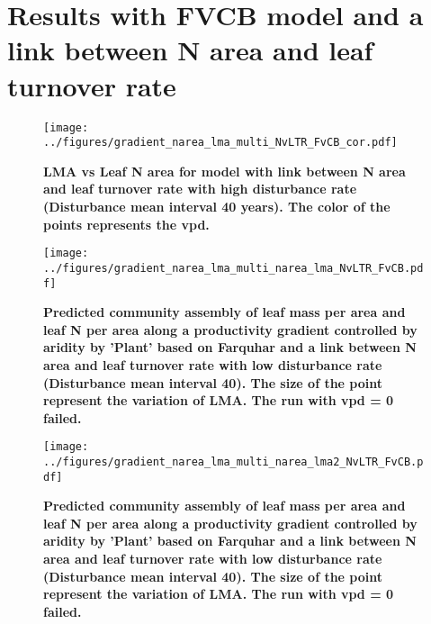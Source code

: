 \documentclass[a4paper,11pt]{article}
\begin{document}
\clearpage



\section{Results with FVCB model and a link between N area and leaf turnover rate}


\begin{figure}[ht]
\centering
\texttt{[image: ../figures/gradient\_narea\_lma\_multi\_NvLTR\_FvCB\_cor.pdf]}
\caption{\textbf{LMA vs Leaf N area for model with link between N area and leaf turnover rate with high disturbance rate (Disturbance mean interval 40 years). The color of the points represents the vpd.}
\label{fig:lma_narea_cor_single_NvLTRSM}}
\end{figure}


\begin{figure}[ht]
\centering
\texttt{[image: ../figures/gradient\_narea\_lma\_multi\_narea\_lma\_NvLTR\_FvCB.pdf]}
\caption{\textbf{Predicted community assembly of leaf mass per area and leaf N per area along a productivity gradient controlled by aridity by 'Plant' based on Farquhar and a link between N area and leaf turnover rate with low disturbance rate (Disturbance mean interval 40). The size of the point represent the variation of LMA. The run with vpd = 0 failed.}
\label{fig:lma_nareaFlSM}}
\end{figure}

\begin{figure}[ht]
\centering
\texttt{[image: ../figures/gradient\_narea\_lma\_multi\_narea\_lma2\_NvLTR\_FvCB.pdf]}
\caption{\textbf{Predicted community assembly of leaf mass per area and leaf N per area along a productivity gradient controlled by aridity by 'Plant' based on Farquhar and a link between N area and leaf turnover rate with low disturbance rate (Disturbance mean interval 40). The size of the point represent the variation of LMA. The run with vpd = 0 failed.}
\label{fig:lma_nareaFl2SM}}
\end{figure}



\end{document}
